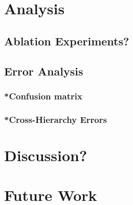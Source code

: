 \section{Analysis} \label{sec:pssanalysis}
\subsection{Ablation Experiments?}
\subsection{Error Analysis}
\subsubsection{*Confusion matrix}
\subsubsection{*Cross-Hierarchy Errors}

\section{Discussion?}

\section{Future Work}

